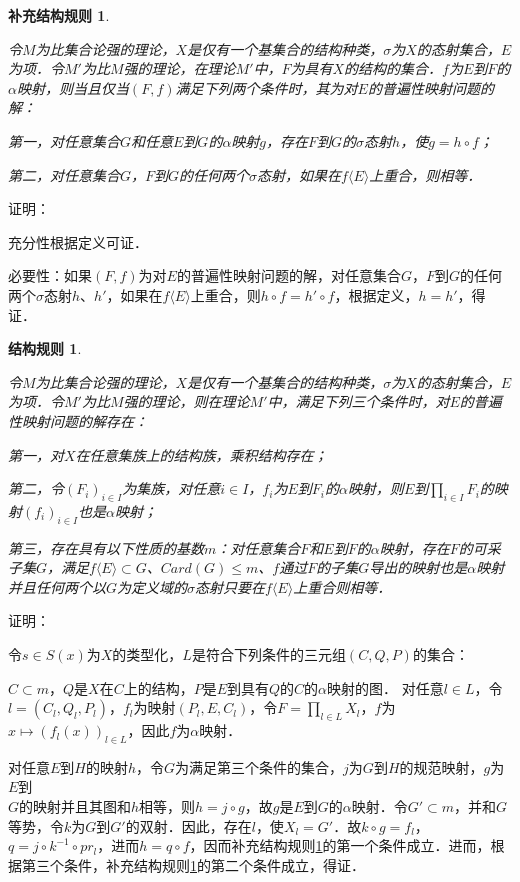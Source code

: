 \documentclass[12pt, a4paper, oneside]{book}
\newtheorem{CST}{结构规则}
\newtheorem{CSTcor}{补充结构规则}
\begin{document}
			\begin{CSTcor}\label{CSTcor15}
				\hfill\par
				令$M$为比集合论强的理论，$X$是仅有一个基集合的结构种类，$\sigma$为$X$的态射集合，$E$为项．令$M'$为比$M$强的理论，在理论$M'$中，$F$为具有$X$的结构的集合．$f$为$E$到$F$的$\alpha$映射，则当且仅当$(F, f)$满足下列两个条件时，其为对$E$的普遍性映射问题的解：
				\par
				第一，对任意集合$G$和任意$E$到$G$的$\alpha$映射$g$，存在$F$到$G$的$\sigma$态射$h$，使$g=h\circ f$；
				\par
				第二，对任意集合$G$，$F$到$G$的任何两个$\sigma$态射，如果在$f\langle E\rangle$上重合，则相等．
			\end{CSTcor}
			证明：
			\par
			充分性根据定义可证．
			\par
			必要性：如果$(F, f)$为对$E$的普遍性映射问题的解，对任意集合$G$，$F$到$G$的任何两个$\sigma$态射$h$、$h'$，如果在$f\langle E\rangle$上重合，则$h\circ f=h'\circ f$，根据定义，$h=h'$，得证．
			
			\begin{CST}\label{CST22}
				\hfill\par
				令$M$为比集合论强的理论，$X$是仅有一个基集合的结构种类，$\sigma$为$X$的态射集合，$E$为项．令$M'$为比$M$强的理论，则在理论$M'$中，满足下列三个条件时，对$E$的普遍性映射问题的解存在：
				\par
				第一，对$X$在任意集族上的结构族，乘积结构存在；
				\par
				第二，令$(F_i)_{i\in I}$为集族，对任意$i\in I$，$f_i$为$E$到$F_i$的$\alpha$映射，则$E$到$\prod\limits_{i\in I}F_i$的映射$(f_i)_{i\in I}$也是$\alpha$映射；
				\par
				第三，存在具有以下性质的基数$m$：对任意集合$F$和$E$到$F$的$\alpha$映射，存在$F$的可采子集$G$，满足$f\langle E\rangle\subset G$、$Card(G)\leq m$、$f$通过$F$的子集$G$导出的映射也是$\alpha$映射并且任何两个以$G$为定义域的$\sigma$态射只要在$f\langle E\rangle$上重合则相等．
			\end{CST}
			证明：
			\par
			令$s\in S(x)$为$X$的类型化，$L$是符合下列条件的三元组$(C, Q, P)$的集合：
			\par
			$C\subset m$，$Q$是$X$在$C$上的结构，$P$是$E$到具有$Q$的$C$的$\alpha$映射的图．
			对任意$l\in L$，令$l=(C_l, Q_l, P_l)$，$f_l$为映射$(P_l, E, C_l)$，令$F=\prod\limits_{l\in L}X_l$，$f$为$x\mapsto (f_l(x))_{l\in L}$，因此$f$为$\alpha$映射．
			\par
			对任意$E$到$H$的映射$h$，令$G$为满足第三个条件的集合，$j$为$G$到$H$的规范映射，$g$为$E$到\\$G$的映射并且其图和$h$相等，则$h=j\circ g$，故$g$是$E$到$G$的$\alpha$映射．令$G'\subset m$，并和$G$等势，令$k$为$G$到$G'$的双射．因此，存在$l$，使$X_l=G'$．故$k\circ g= f_l$，$q=j\circ k^{-1}\circ pr_l$，进而$h=q\circ f$，因而补充结构规则\ref{CSTcor15}的第一个条件成立．进而，根据第三个条件，补充结构规则\ref{CSTcor15}的第二个条件成立，得证．
			
\end{document}

